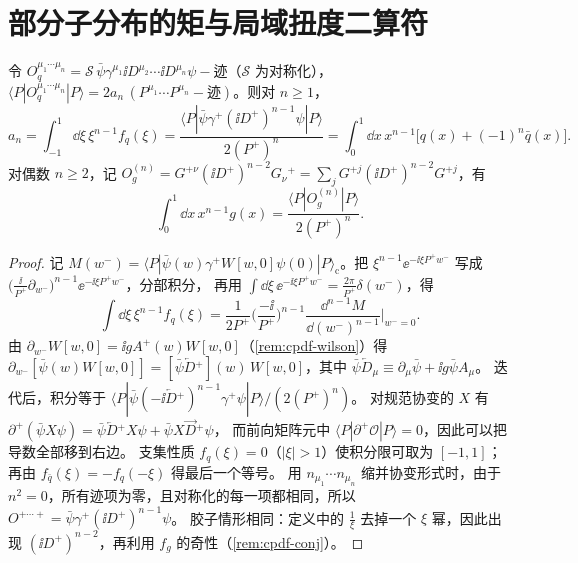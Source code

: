 \section{部分子分布的矩与局域扭度二算符}\label{sec:cpdf-moments}

\begin{theorem}[矩与局域算符]\tagR\label{thm:cpdf-moments}
令 $O_q^{\mu_1\cdots\mu_n}=\mathcal S\,\bar\psi\gamma^{\mu_1}\ii D^{\mu_2}\cdots\ii D^{\mu_n}\psi-\text{迹}$（$\mathcal S$ 为对称化），
$\langle P|O_q^{\mu_1\cdots\mu_n}|P\rangle=2a_n\,(P^{\mu_1}\cdots P^{\mu_n}-\text{迹})$。则对 $n\ge1$，
\begin{equation}\label{eq:cpdf-moment}
a_n=\int_{-1}^{1}\dd\xi\,\xi^{n-1}f_q(\xi)=\frac{\langle P|\bar\psi\gamma^+(\ii D^+)^{n-1}\psi|P\rangle}{2(P^+)^n}
=\int_0^1\dd x\,x^{n-1}\big[q(x)+(-1)^n\bar q(x)\big].
\end{equation}
对偶数 $n\ge2$，记 $O_g^{(n)}=G^{+\nu}(\ii D^+)^{n-2}G_\nu{}^{+}=\sum_jG^{+j}(\ii D^+)^{n-2}G^{+j}$，有
\begin{equation}\label{eq:cpdf-moment-g}
\int_0^1\dd x\,x^{n-1}g(x)=\frac{\langle P|O_g^{(n)}|P\rangle}{2(P^+)^n}.
\end{equation}
\end{theorem}

\begin{proof}
记 $M(w^-)=\langle P|\bar\psi(w)\gamma^+W[w,0]\psi(0)|P\rangle_{\mathrm c}$。把 $\xi^{n-1}\ee^{-\ii\xi P^+w^-}$ 写成 $\big(\frac{\ii}{P^+}\partial_{w^-}\big)^{n-1}\ee^{-\ii\xi P^+w^-}$，分部积分，
再用 $\int\dd\xi\,\ee^{-\ii\xi P^+w^-}=\frac{2\pi}{P^+}\delta(w^-)$，得
\[
\int\dd\xi\,\xi^{n-1}f_q(\xi)=\frac{1}{2P^+}\Big(\frac{-\ii}{P^+}\Big)^{n-1}\frac{\dd^{n-1}M}{\dd(w^-)^{n-1}}\Big|_{w^-=0}.
\]
由 $\partial_{w^-}W[w,0]=\ii gA^+(w)W[w,0]$（\cref{rem:cpdf-wilson}）得
$\partial_{w^-}[\bar\psi(w)W[w,0]]=[\bar\psi\overleftarrow{D}{}^+](w)\,W[w,0]$，其中 $\bar\psi\overleftarrow{D}_\mu\equiv\partial_\mu\bar\psi+\ii g\bar\psi A_\mu$。
迭代后，积分等于 $\langle P|\bar\psi(-\ii\overleftarrow{D}{}^+)^{n-1}\gamma^+\psi|P\rangle/(2(P^+)^n)$。
对规范协变的 $X$ 有 $\partial^+(\bar\psi X\psi)=\bar\psi\overleftarrow{D}{}^+X\psi+\bar\psi X\overrightarrow{D}{}^+\psi$，
而前向矩阵元中 $\langle P|\partial^+\mathcal O|P\rangle=0$，因此可以把导数全部移到右边。
支集性质 $f_q(\xi)=0$（$|\xi|>1$）使积分限可取为 $[-1,1]$；再由 $f_{\bar q}(\xi)=-f_q(-\xi)$ 得最后一个等号。
用 $n_{\mu_1}\cdots n_{\mu_n}$ 缩并协变形式时，由于 $n^2=0$，所有迹项为零，且对称化的每一项都相同，所以 $O^{+\cdots+}=\bar\psi\gamma^+(\ii D^+)^{n-1}\psi$。
胶子情形相同：定义中的 $\frac1\xi$ 去掉一个 $\xi$ 幂，因此出现 $(\ii D^+)^{n-2}$，再利用 $f_g$ 的奇性（\cref{rem:cpdf-conj}）。
\end{proof}

